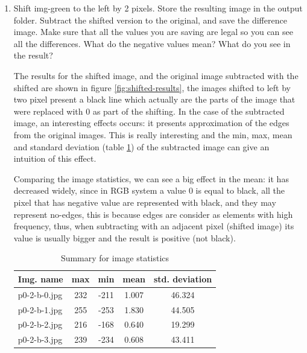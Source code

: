 \begin{enumerate}[label=\emph{\alph*)}]
\item Shift img-green to the left by 2 pixels. Store the resulting image in the output folder. Subtract the shifted version to the original, and save the difference image. Make sure that all the values you are saving are legal so you can see all the differences. What do the negative values mean? What do you see in the result?

The results for the shifted image, and the original image subtracted with the shifted are shown in figure \ref{fig:shifted-results}, the images shifted to left by two pixel present a black line which actually are the parts of the image that were replaced with 0 as part of the shifting. In the case of the subtracted image, an interesting effects occurs: it presents approximation of the edges from the original images. This is really interesting and the min, max, mean and standard deviation (table \ref{table:statistics-shifted}) of the subtracted image can give an intuition of this effect.

Comparing the image statistics, we can see a big effect in the mean: it has decreased widely, since in RGB system a value 0 is equal to black, all the pixel that has negative value are represented with black, and they may represent no-edges, this is because edges are consider as elements with high frequency, thus, when subtracting with an adjacent pixel (shifted image) its value is usually bigger and the result is positive (not black).


\begin{table} [!htb]
\setlength{\tabcolsep}{2.7mm}
\centering
\begin{tabular}{lcccc}
\toprule
\textbf{Img. name}  & \textbf{max} & \textbf{min} & \textbf{mean} & \textbf{std. deviation}\\
\midrule
p0-2-b-0.jpg & 232 & -211 & 1.007 & 46.324 \\
p0-2-b-1.jpg & 255 & -253 & 1.830 & 44.505 \\
p0-2-b-2.jpg & 216 & -168 & 0.640 & 19.299 \\
p0-2-b-3.jpg & 239 & -234 & 0.608 & 43.411 \\
\bottomrule
\end{tabular}
\caption{Summary for image statistics}
\label{table:statistics-shifted}
\end{table}


\end{enumerate}
